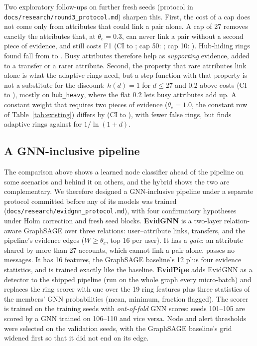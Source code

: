 Two exploratory follow-ups on further fresh seeds (protocol in
\texttt{docs/research/round3\_protocol.md}) sharpen this. First, the cost of a cap
does not come only from attributes that could link a pair alone. A cap of 27
removes exactly the attributes that, at $\theta_e=0.3$, can never link a pair
without a second piece of evidence, and still costs \RtCapTwentySevenD{} F1 (CI
\RtCapTwentySevenLo{} to \RtCapTwentySevenHi{}; cap 50: \RtCapFiftyD{}; cap 10:
\RtCapTenD{}). Hub-hiding rings found fall from \RtCapHHNo{} to
\RtCapHHTwentySeven{}. Busy attributes therefore help as \emph{supporting}
evidence, added to a transfer or a rarer attribute. Second, the property that
rare attributes link alone is what the adaptive rings need, but a step function
with that property is not a substitute for the discount: $h(d)=1$ for $d\le27$ and
0.2 above costs \RtStepD{} (CI \RtStepLo{} to \RtStepHi{}), mostly on
\texttt{hub\_heavy}, where the flat 0.2 lets busy attributes add up. A constant
weight that requires two pieces of evidence ($\theta_e=1.0$, the constant row of
Table~\ref{tab:existing}) differs by \RtConstTwoD{} (CI \RtConstTwoLo{} to \RtConstTwoHi{}),
with fewer false rings, but finds \RtConstTwoAdapt{} adaptive rings against
\RtLogAdapt{} for $1/\ln(1+d)$.

\subsection{A GNN-inclusive pipeline}
\label{sec:gnnpipe}

The comparison above shows a learned node classifier ahead of the pipeline on
some scenarios and behind it on others, and the hybrid shows the two are
complementary. We therefore designed a GNN-inclusive pipeline under a separate
protocol committed before any of its models was trained
(\texttt{docs/research/evidgnn\_protocol.md}), with four confirmatory
hypotheses under Holm correction and fresh seed blocks.
\textbf{EvidGNN} is a two-layer relation-aware GraphSAGE over three relations:
user--attribute links, transfers, and the pipeline's evidence edges ($W\ge\theta_e$,
top 16 per user). It has a \emph{gate}: an attribute shared by more than 27
accounts, which cannot link a pair alone, passes no messages. It has 16
features, the GraphSAGE baseline's 12 plus four evidence statistics, and is trained
exactly like the baseline. \textbf{EvidPipe} adds EvidGNN as a detector to the
shipped pipeline (run on the whole graph every micro-batch) and replaces the
ring scorer with one over the 19 ring features plus three statistics of the
members' GNN probabilities (mean, minimum, fraction flagged). The scorer is
trained on the training seeds with \emph{out-of-fold} GNN scores: seeds
101--105 are scored by a GNN trained on 106--110 and vice versa. Node and alert
thresholds were selected on the validation seeds, with the GraphSAGE
baseline's grid widened first so that it did not end on its edge.

